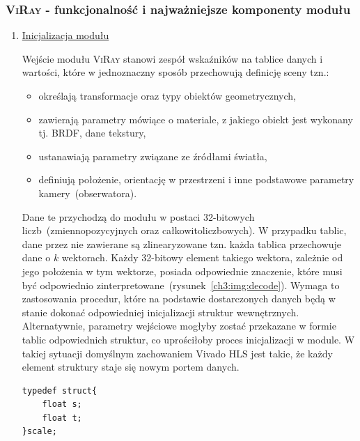 \subsubsection{\textsc{ViRay} - funkcjonalność i najważniejsze komponenty modułu}
\begin{enumerate}


\item \underline{Inicjalizacja modułu}

Wejście modułu \textsc{ViRay} stanowi zespół wskaźników na tablice danych i wartości, które w jednoznaczny sposób przechowują definicję sceny tzn.:
\begin{itemize}
\item określają transformacje oraz typy obiektów geometrycznych,
\item zawierają parametry mówiące o materiale, z jakiego obiekt jest wykonany tj. BRDF, dane tekstury,
\item ustanawiają parametry związane ze źródłami światła,
\item definiują położenie, orientację w przestrzeni i inne podstawowe parametry kamery~(obserwatora).
\end{itemize}
Dane te przychodzą do modułu w postaci 32-bitowych liczb~(zmiennopozycyjnych oraz całkowitoliczbowych). W przypadku tablic, dane przez nie zawierane są zlinearyzowane tzn. każda tablica przechowuje dane o $k$ wektorach. Każdy 32-bitowy element takiego wektora, zależnie od jego położenia w tym wektorze, posiada odpowiednie znaczenie, które musi być odpowiednio zinterpretowane~(rysunek~\ref{ch3:img:decode}). Wymaga to zastosowania procedur, które na podstawie dostarczonych danych będą w stanie dokonać odpowiedniej inicjalizacji struktur wewnętrznych.
Alternatywnie, parametry wejściowe mogłyby zostać przekazane w formie tablic odpowiednich struktur, co uprościłoby proces inicjalizacji w module. W takiej sytuacji domyślnym zachowaniem Vivado HLS jest takie, że każdy element struktury staje się nowym portem danych.
\begin{lstlisting}
typedef struct{
	float s;
	float t;
}scale;
\end{lstlisting}

\end{enumerate}
